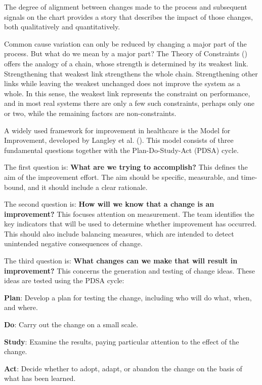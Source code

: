 \documentclass[
]{book}
\begin{document}
The degree of alignment between changes made to the process and subsequent signals on the chart provides a story that describes the impact of those changes, both qualitatively and quantitatively.

Common cause variation can only be reduced by changing a major part of the process. But what do we mean by a major part? The Theory of Constraints () offers the analogy of a chain, whose strength is determined by its weakest link. Strengthening that weakest link strengthens the whole chain. Strengthening other links while leaving the weakest unchanged does not improve the system as a whole. In this sense, the weakest link represents the constraint on performance, and in most real systems there are only a few such constraints, perhaps only one or two, while the remaining factors are non-constraints.

A widely used framework for improvement in healthcare is the Model for Improvement, developed by Langley et al. (). This model consists of three fundamental questions together with the Plan-Do-Study-Act (PDSA) cycle.

The first question is: \textbf{What are we trying to accomplish?} This defines the aim of the improvement effort. The aim should be specific, measurable, and time-bound, and it should include a clear rationale.

The second question is: \textbf{How will we know that a change is an improvement?} This focuses attention on measurement. The team identifies the key indicators that will be used to determine whether improvement has occurred. This should also include balancing measures, which are intended to detect unintended negative consequences of change.

The third question is: \textbf{What changes can we make that will result in improvement?} This concerns the generation and testing of change ideas. These ideas are tested using the PDSA cycle:

\textbf{Plan}: Develop a plan for testing the change, including who will do what, when, and where.

\textbf{Do}: Carry out the change on a small scale.

\textbf{Study}: Examine the results, paying particular attention to the effect of the change.

\textbf{Act}: Decide whether to adopt, adapt, or abandon the change on the basis of what has been learned.
\end{document}
